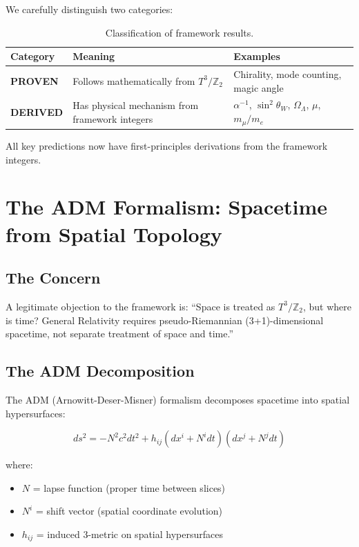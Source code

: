 \documentclass[12pt,a4paper]{article}
\newcommand{\Ztwo}{\mathbb{Z}_2}
\newcommand{\Tthree}{T^3}
\newcommand{\OmegaL}{\Omega_\Lambda}
\newcommand{\sinW}{\sin^2\theta_W}
\begin{document}
We carefully distinguish two categories:

\begin{table}[H]
\centering
\begin{tabular}{lll}
\toprule
\textbf{Category} & \textbf{Meaning} & \textbf{Examples} \\
\midrule
\textbf{PROVEN} & Follows mathematically from $\Tthree/\Ztwo$ & Chirality, mode counting, magic angle \\
\textbf{DERIVED} & Has physical mechanism from framework integers & $\alpha^{-1}$, $\sinW$, $\OmegaL$, $\mu$, $m_\mu/m_e$ \\
\bottomrule
\end{tabular}
\caption{Classification of framework results.}
\end{table}

All key predictions now have first-principles derivations from the framework integers.

\section{The ADM Formalism: Spacetime from Spatial Topology}
\label{sec:adm}

\subsection{The Concern}

A legitimate objection to the framework is: ``Space is treated as $\Tthree/\Ztwo$, but where is time? General Relativity requires pseudo-Riemannian (3+1)-dimensional spacetime, not separate treatment of space and time.''

\subsection{The ADM Decomposition}

The ADM (Arnowitt-Deser-Misner) formalism decomposes spacetime into spatial hypersurfaces:

\begin{equation}
ds^2 = -N^2 c^2 dt^2 + h_{ij}(dx^i + N^i dt)(dx^j + N^j dt)
\end{equation}

where:
\begin{itemize}
    \item $N$ = lapse function (proper time between slices)
    \item $N^i$ = shift vector (spatial coordinate evolution)
    \item $h_{ij}$ = induced 3-metric on spatial hypersurfaces
\end{itemize}
\end{document}

